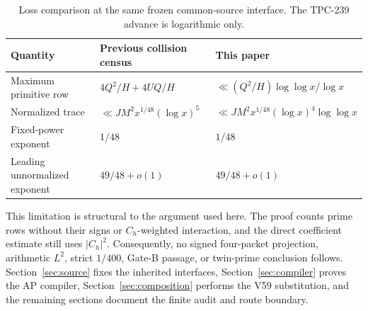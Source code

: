 \begin{table}[ht]
\centering
\small
\caption{Loss comparison at the same frozen common-source interface.  The
TPC-239 advance is logarithmic only.}
\label{tab:comparison}
\begin{tabular}{@{}lll@{}}
\toprule
Quantity & Previous collision census & This paper \\
\midrule
Maximum primitive row
 & $4Q^2/H+4UQ/H$
 & $\ll (Q^2/H)\log\log x/\log x$ \\
Normalized trace
 & $\ll JM^2x^{1/48}(\log x)^5$
 & $\ll JM^2x^{1/48}(\log x)^4\log\log x$ \\
Fixed-power exponent & $1/48$ & $1/48$ \\
Leading unnormalized exponent & $49/48+o(1)$ & $49/48+o(1)$ \\
\bottomrule
\end{tabular}
\end{table}

This limitation is structural to the argument used here.  The proof counts
prime rows without their signs or $C_h$-weighted interaction, and the direct
coefficient estimate still uses $|C_h|^2$.  Consequently, no signed
four-packet projection, arithmetic $L^2$, strict $1/400$, Gate-B passage,
or twin-prime conclusion follows.  Section~\ref{sec:source} fixes the inherited
interfaces, Section~\ref{sec:compiler} proves the AP compiler,
Section~\ref{sec:composition} performs the V59 substitution, and the remaining
sections document the finite audit and route boundary.
